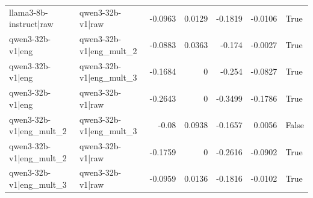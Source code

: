 \begin{table}
\begin{tabular}{l l r r r r l}
llama3-8b-instruct|raw & qwen3-32b-v1|raw & -0.0963 & 0.0129 & -0.1819 & -0.0106 & True \\
qwen3-32b-v1|eng & qwen3-32b-v1|eng_mult_2 & -0.0883 & 0.0363 & -0.174 & -0.0027 & True \\
qwen3-32b-v1|eng & qwen3-32b-v1|eng_mult_3 & -0.1684 & 0 & -0.254 & -0.0827 & True \\
qwen3-32b-v1|eng & qwen3-32b-v1|raw & -0.2643 & 0 & -0.3499 & -0.1786 & True \\
qwen3-32b-v1|eng_mult_2 & qwen3-32b-v1|eng_mult_3 & -0.08 & 0.0938 & -0.1657 & 0.0056 & False \\
qwen3-32b-v1|eng_mult_2 & qwen3-32b-v1|raw & -0.1759 & 0 & -0.2616 & -0.0902 & True \\
qwen3-32b-v1|eng_mult_3 & qwen3-32b-v1|raw & -0.0959 & 0.0136 & -0.1816 & -0.0102 & True \\
\bottomrule
\end{tabular}
\end{table}
